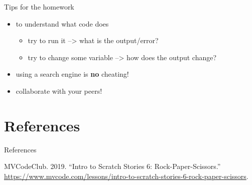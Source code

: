 \documentclass[
  american,
  ignorenonframetext,
]{beamer}
\begin{document}
\begin{frame}{Tips for the homework}
\protect\hypertarget{tips-for-the-homework}{}

\begin{itemize}
\item
  to understand what code does

  \begin{itemize}
  \item
    try to run it --\textgreater{} what is the output/error?
  \item
    try to change some variable --\textgreater{} how does the output
    change?
  \end{itemize}
\item
  using a search engine is \textbf{no} cheating!
\item
  collaborate with your peers!
\end{itemize}


\end{frame}

\section*{References}

\begin{frame}{References}

\hypertarget{refs}{}
\leavevmode\hypertarget{ref-mv_code_club2019}{}%
MVCodeClub. 2019. ``Intro to Scratch Stories 6: Rock-Paper-Scissors.''
\url{https://www.mvcode.com/lessons/intro-to-scratch-stories-6-rock-paper-scissors}.

\end{frame}
\end{document}

